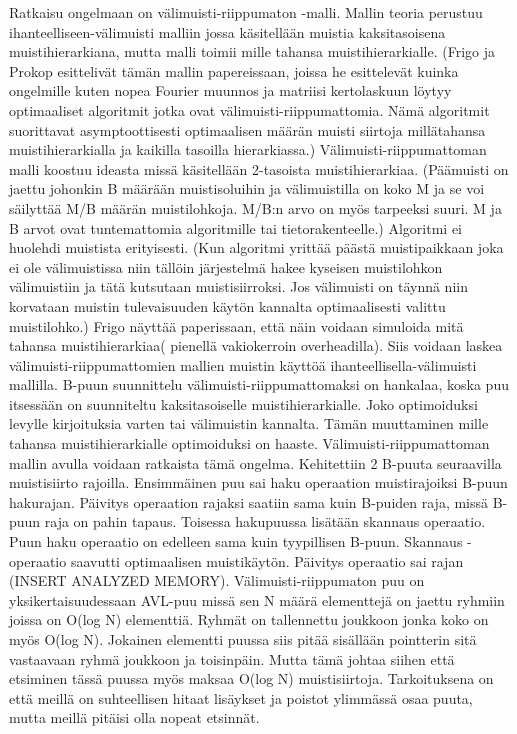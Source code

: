 \documentclass[finnish]{tktltiki2}
\theoremstyle{definition}
\theoremstyle{remark}
\begin{document}
    Ratkaisu ongelmaan on välimuisti-riippumaton -malli. Mallin teoria perustuu ihanteelliseen-välimuisti malliin jossa käsitellään muistia kaksitasoisena muistihierarkiana, mutta malli toimii mille tahansa muistihierarkialle. (Frigo ja Prokop esittelivät tämän mallin papereissaan, joissa he esittelevät kuinka ongelmille kuten nopea Fourier muunnos ja matriisi kertolaskuun löytyy optimaaliset algoritmit jotka ovat välimuisti-riippumattomia. Nämä algoritmit suorittavat asymptoottisesti optimaalisen määrän muisti siirtoja millätahansa muistihierarkialla ja kaikilla tasoilla hierarkiassa.) Välimuisti-riippumattoman malli koostuu ideasta missä käsitellään 2-tasoista muistihierarkiaa. (Päämuisti on jaettu johonkin B määrään muistisoluihin ja välimuistilla on koko M ja se voi säilyttää M/B määrän muistilohkoja. M/B:n arvo on myös tarpeeksi suuri. M ja B arvot ovat tuntemattomia algoritmille tai tietorakenteelle.) Algoritmi  ei huolehdi muistista erityisesti. (Kun algoritmi yrittää päästä muistipaikkaan joka ei ole välimuistissa niin tällöin järjestelmä hakee kyseisen muistilohkon välimuistiin ja tätä kutsutaan muistisiirroksi. Jos välimuisti on täynnä niin korvataan muistin tulevaisuuden käytön kannalta optimaalisesti valittu muistilohko.) Frigo näyttää paperissaan, että näin voidaan simuloida mitä tahansa muistihierarkiaa( pienellä vakiokerroin overheadilla). Siis voidaan laskea välimuisti-riippumattomien mallien muistin käyttöä ihanteellisella-välimuisti mallilla.
      B-puun suunnittelu välimuisti-riippumattomaksi on hankalaa, koska puu itsessään on suunniteltu kaksitasoiselle muistihierarkialle. Joko optimoiduksi levylle kirjoituksia varten tai välimuistin kannalta. Tämän muuttaminen mille tahansa muistihierarkialle optimoiduksi on haaste.
        Välimuisti-riippumattoman mallin avulla voidaan ratkaista tämä ongelma. Kehitettiin 2 B-puuta seuraavilla muistisiirto rajoilla. Ensimmäinen puu sai haku operaation muistirajoiksi B-puun hakurajan. Päivitys operaation rajaksi saatiin sama kuin B-puiden raja, missä B-puun raja on pahin tapaus. Toisessa hakupuussa lisätään skannaus operaatio. Puun haku operaatio on edelleen sama kuin tyypillisen B-puun. Skannaus -operaatio saavutti optimaalisen muistikäytön. Päivitys operaatio sai rajan (INSERT ANALYZED MEMORY).
          Välimuisti-riippumaton puu on yksikertaisuudessaan AVL-puu missä sen N määrä elementtejä on jaettu ryhmiin joissa on O(log N) elementtiä. Ryhmät on tallennettu joukkoon jonka koko on myös O(log N). Jokainen elementti puussa siis pitää sisällään pointterin sitä vastaavaan ryhmä joukkoon ja toisinpäin. Mutta tämä johtaa siihen että etsiminen tässä puussa myös maksaa O(log N) muistisiirtoja. Tarkoituksena on että meillä on suhteellisen hitaat lisäykset ja poistot ylimmässä osaa puuta, mutta meillä pitäisi olla nopeat etsinnät.
\end{document}
